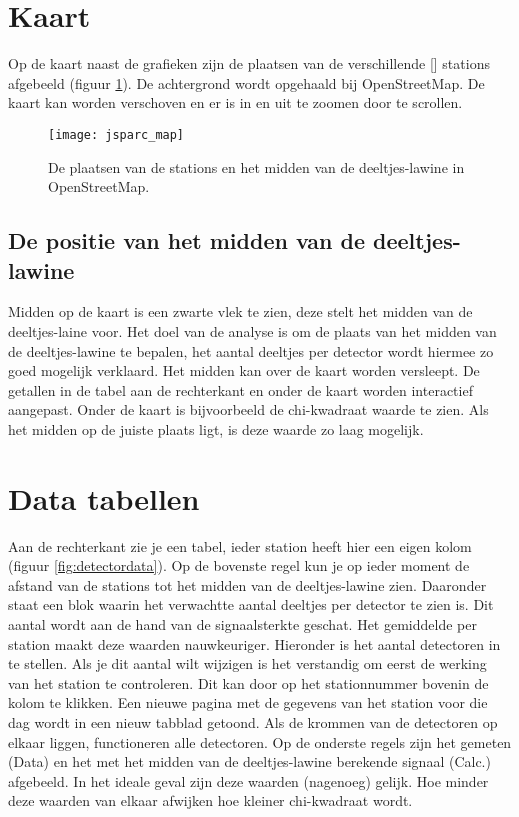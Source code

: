 \section{Kaart}

Op de kaart naast de grafieken zijn de plaatsen van de verschillende [\hisparc] stations
afgebeeld (figuur \ref{fig:core}). De achtergrond wordt opgehaald bij OpenStreetMap. De kaart kan 
worden verschoven en er is in en uit te zoomen door te scrollen.

\begin{figure}[H]
    \centering
    \texttt{[image: jsparc\_map]}
    \caption{De plaatsen van de stations en het midden van de deeltjes-lawine in OpenStreetMap.}
    \label{fig:core}
\end{figure}

\subsection{De positie van het midden van de deeltjes-lawine}

Midden op de kaart is een zwarte vlek te zien, deze stelt het midden van de 
deeltjes-laine voor. Het doel van de analyse is om de plaats van het midden 
van de deeltjes-lawine te bepalen, het aantal deeltjes per detector wordt 
hiermee zo goed mogelijk verklaard. Het midden kan over de kaart worden 
versleept. De getallen in de tabel aan de rechterkant en onder de kaart worden 
interactief aangepast. Onder de kaart is bijvoorbeeld de chi-kwadraat waarde 
te zien. Als het midden op de juiste plaats ligt, is deze waarde zo laag 
mogelijk.


\section{Data tabellen}

Aan de rechterkant zie je een tabel, ieder station heeft hier een eigen kolom 
(figuur \ref{fig:detectordata}).
Op de bovenste regel kun je op ieder moment de afstand van de stations tot 
het midden van de deeltjes-lawine zien. Daaronder staat een blok waarin het 
verwachtte aantal deeltjes per detector te zien is. Dit aantal wordt aan de 
hand van de signaalsterkte geschat. Het gemiddelde per station maakt deze 
waarden nauwkeuriger. Hieronder is het aantal detectoren in te stellen. Als je 
dit aantal wilt wijzigen is het verstandig om eerst de werking van het station 
te controleren. Dit kan door op het stationnummer bovenin de kolom te klikken. 
Een nieuwe pagina met de gegevens van het station voor die dag wordt in een 
nieuw tabblad getoond. Als de krommen van de detectoren op elkaar liggen, 
functioneren alle detectoren.
Op de onderste regels zijn het gemeten (Data) en het met het midden van de 
deeltjes-lawine berekende signaal (Calc.) afgebeeld. In het ideale geval zijn 
deze waarden (nagenoeg) gelijk. 
Hoe minder deze waarden van elkaar afwijken hoe kleiner chi-kwadraat wordt.

